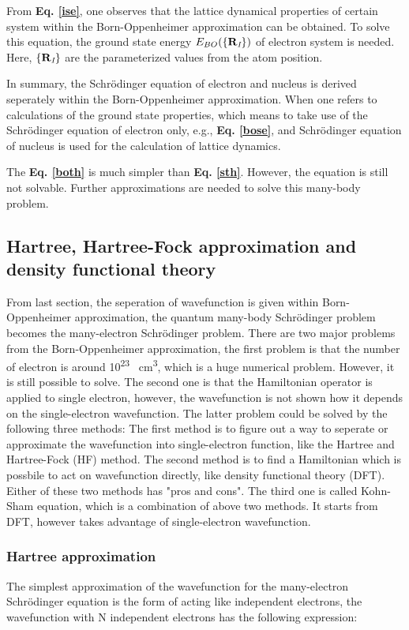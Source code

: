 \documentclass[a4paper, 12pt, titlepage,oneside,drop]{kthesis}
\begin{document}
From \textbf{Eq. \ref{ise}}, one observes that the lattice dynamical properties of certain system within the Born-Oppenheimer approximation can be obtained. To solve this equation,
the ground state energy $E_{BO}(\{{{\textbf R}_{\textit I}}\})$ of electron system is needed. Here, $\{{\textbf R}_{\textit I}\}$ are the parameterized values from the atom position.
 
In summary, the Schrödinger equation of electron and nucleus is derived seperately within the Born-Oppenheimer approximation. When one refers to calculations of the ground state properties,
which means to take use of the Schrödinger equation of electron only, e.g., \textbf{Eq. \ref{bose}}, and Schrödinger equation of nucleus is used for the calculation of lattice dynamics.

The \textbf{Eq. \ref{both}} is much simpler than \textbf{Eq. \ref{sth}}. However, the equation is still not solvable. Further approximations  are needed
to solve this many-body problem.

\subsection{Hartree, Hartree-Fock approximation and density functional theory}

From last section, the seperation of wavefunction is given within Born-Oppenheimer approximation, the quantum many-body Schrödinger problem becomes the many-electron 
Schrödinger problem. There are two major problems from the Born-Oppenheimer approximation, the first problem is that the number of electron is around 10\textsuperscript{23} \si{\per\cubic\centi\metre}, which is a huge numerical problem.
However, it is still possible to solve.
The second one is that the Hamiltonian operator is applied to single electron, however, the wavefunction is not shown how it depends on the single-electron wavefunction. The latter problem 
could be solved by the following three methods: The first method is to figure out a way to seperate or approximate the wavefunction into single-electron function, like the Hartree and Hartree-Fock (HF) method. The second method is to
find a Hamiltonian which is possbile to act on wavefunction directly, like density functional theory (DFT). Either of these two methods has "pros and cons". The third one is called Kohn-Sham equation,
which is a combination of above two methods. It starts from DFT, however takes advantage of single-electron wavefunction. 

\subsubsection{Hartree approximation}
\label{ha}
The simplest approximation of the wavefunction for the many-electron Schrödinger equation is the form of acting like independent
electrons, the wavefunction with N independent electrons has the following expression:
\end{document}
